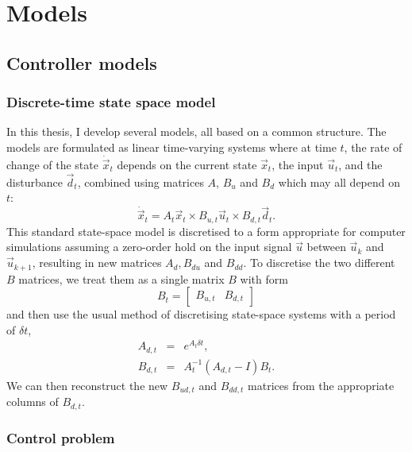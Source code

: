 \chapter{Models}

\section{Controller models}

\subsection{Discrete-time state space model}

In this thesis, I develop several models, all based on a common structure.
The models are formulated as linear time-varying systems where at time $t$, the rate of change of the state $\dot{\vec{x}}_t$ depends on the current state $\vec{x}_t$, the input $\vec{u}_t$, and the disturbance $\vec{d}_t$, combined using matrices $A$, $B_u$ and $B_d$ which may all depend on $t$:
\begin{equation}
	\dot{\vec{x}}_t = A_t \vec{x}_t \times B_{u, t} \vec{u}_t \times B_{d, t} \vec{d}_t.
	\label{eq:xdot}
\end{equation}
This standard state-space model is discretised to a form appropriate for computer simulations assuming a zero-order hold on the input signal $\vec{u}$ between $\vec{u}_k$ and $\vec{u}_{k+1}$, resulting in new matrices $A_d, B_{du}$ and $B_{dd}$.
To discretise the two different $B$ matrices, we treat them as a single matrix $B$ with form
\begin{displaymath}
	B_t = \left[\begin{array}{cc}
		B_{u, t} & B_{d, t}
	\end{array}\right]
\end{displaymath}
and then use the usual method of discretising state-space systems with a period of $\delta t$,
\begin{eqnarray}
	A_{d, t} &=& e^{A_t \delta t}, \\
	B_{d, t} &=& A_t^{-1} (A_{d, t} - I) B_t.
\end{eqnarray}
We can then reconstruct the new $B_{ud, t}$ and $B_{dd, t}$ matrices from the appropriate columns of $B_{d, t}$.

\subsection{Control problem}

